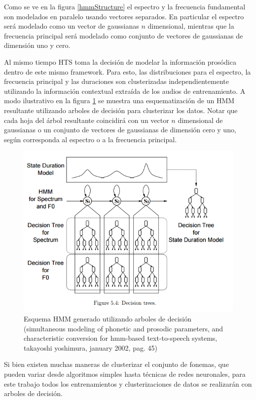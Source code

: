 Como se ve en la figura \ref{hmmStructure} el espectro y la frecuencia fundamental son modelados en paralelo usando vectores separados. En particular el espectro será modelado como un vector de gaussianas $n$ dimensional, mientras que la frecuencia principal será modelado como conjunto de vectores de gaussianas de dimensión uno y cero.

Al mismo tiempo HTS toma la decisión de modelar la información prosódica dentro de este mismo framework. Para esto, las distribuciones para el espectro, la frecuencia principal y las duraciones son clusterizadas independientemente utilizando la información contextual extraída de los audios de entrenamiento. A modo ilustrativo en la figura \ref{hmmTree} se muestra una esquematización de un HMM resultante utilizando arboles de decisión para clusterizar los datos. Notar que cada hoja del árbol resultante coincidirá con un vector $n$ dimensional de gaussianas o un conjunto de vectores de gaussianas de dimensión cero y uno, según corresponda al espectro o a la frecuencia principal.

\begin{figure}
\includegraphics[scale=0.5]{imagenes/hmmContext.png}
\caption{Esquema HMM generado utilizando arboles de decisión (simultaneous modeling of phonetic and prosodic parameters, and characteristic conversion for hmm-based text-to-speech systems, takayoshi yoshimura, january 2002, pag. 45)}
\label{hmmTree}
\centering
\end{figure}

Si bien existen muchas maneras de clusterizar el conjunto de fonemas, que pueden variar desde algoritmos simples hasta técnicas de redes neuronales, para este trabajo todos los entrenamientos y clusterizaciones de datos se realizarán con arboles de decisión. 

